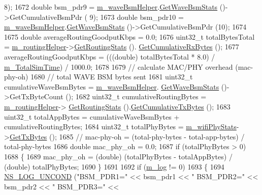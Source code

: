 \begin{DoxyCode}
      8);
1672   \textcolor{keywordtype}{double} bsm\_pdr9 = \hyperlink{classVanetRoutingExperiment_a690b550804fc4c9bcfab6b8ae40e4728}{m\_waveBsmHelper}.\hyperlink{classns3_1_1WaveBsmHelper_a7b7442d597cc104a22c8c4bef6c98c6e}{GetWaveBsmStats} ()->GetCumulativeBsmPdr (
      9);
1673   \textcolor{keywordtype}{double} bsm\_pdr10 = \hyperlink{classVanetRoutingExperiment_a690b550804fc4c9bcfab6b8ae40e4728}{m\_waveBsmHelper}.\hyperlink{classns3_1_1WaveBsmHelper_a7b7442d597cc104a22c8c4bef6c98c6e}{GetWaveBsmStats} ()->GetCumulativeBsmPdr 
      (10);
1674 
1675   \textcolor{keywordtype}{double} averageRoutingGoodputKbps = 0.0;
1676   uint32\_t totalBytesTotal = \hyperlink{classVanetRoutingExperiment_afbd666dc1310ae1903438ab9073409d5}{m\_routingHelper}->\hyperlink{classRoutingHelper_ae3bfcf80989af6e77fa131d5787302c5}{GetRoutingStats} ().
      \hyperlink{classRoutingStats_ad8f272c14a4f74f764169f30455ace65}{GetCumulativeRxBytes} ();
1677   averageRoutingGoodputKbps = (((double) totalBytesTotal * 8.0) / \hyperlink{classVanetRoutingExperiment_acae630bc30645931dcb68283b0217b1b}{m\_TotalSimTime}) / 1000.0;
1678 
1679   \textcolor{comment}{// calculate MAC/PHY overhead (mac-phy-oh)}
1680   \textcolor{comment}{// total WAVE BSM bytes sent}
1681   uint32\_t cumulativeWaveBsmBytes = \hyperlink{classVanetRoutingExperiment_a690b550804fc4c9bcfab6b8ae40e4728}{m\_waveBsmHelper}.
      \hyperlink{classns3_1_1WaveBsmHelper_a7b7442d597cc104a22c8c4bef6c98c6e}{GetWaveBsmStats} ()->GetTxByteCount ();
1682   uint32\_t cumulativeRoutingBytes = \hyperlink{classVanetRoutingExperiment_afbd666dc1310ae1903438ab9073409d5}{m\_routingHelper}->
      \hyperlink{classRoutingHelper_ae3bfcf80989af6e77fa131d5787302c5}{GetRoutingStats} ().\hyperlink{classRoutingStats_ac3553f60b36e358540d8f21a91f20a4b}{GetCumulativeTxBytes} ();
1683   uint32\_t totalAppBytes = cumulativeWaveBsmBytes + cumulativeRoutingBytes;
1684   uint32\_t totalPhyBytes = \hyperlink{classVanetRoutingExperiment_a6b7260aa3838c95f5a839d0cea09393f}{m\_wifiPhyStats}->\hyperlink{classWifiPhyStats_ab5878680763677fc1f1697d013010e52}{GetTxBytes} ();
1685   \textcolor{comment}{// mac-phy-oh = (total-phy-bytes - total-app-bytes) / total-phy-bytes}
1686   \textcolor{keywordtype}{double} mac\_phy\_oh = 0.0;
1687   \textcolor{keywordflow}{if} (totalPhyBytes > 0)
1688     \{
1689       mac\_phy\_oh = (double) (totalPhyBytes - totalAppBytes) / (double) totalPhyBytes;
1690     \}
1691 
1692   \textcolor{keywordflow}{if} (\hyperlink{classVanetRoutingExperiment_a00992fb96b315d44825876814cb37af8}{m\_log} != 0)
1693     \{
1694       \hyperlink{log-macros-disabled_8h_a0b36e5e182b37194f85ef1c5e979fb2e}{NS\_LOG\_UNCOND} (\textcolor{stringliteral}{"BSM\_PDR1="} << bsm\_pdr1 << \textcolor{stringliteral}{" BSM\_PDR2="} << bsm\_pdr2 << \textcolor{stringliteral}{" BSM\_PDR3="} << 

\end{DoxyCode}
